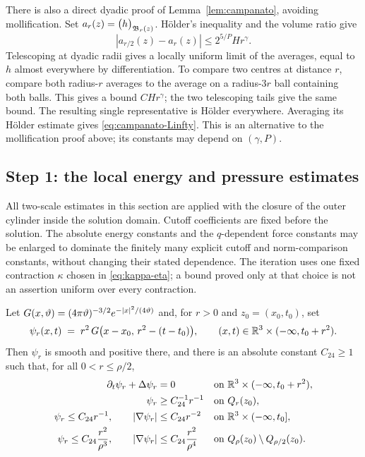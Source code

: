 \documentclass[11pt,reqno]{amsart}
\begin{document}
\begin{remark}
There is also a direct dyadic proof of Lemma~\ref{lem:campanato}, avoiding
mollification. Set $a_r(z)=\bigl(h\bigr)_{\mathfrak B_r(z)}$.
H\"older's inequality and the volume ratio give
\[
 |a_{r/2}(z)-a_r(z)|\le 2^{5/P}H r^\gamma .
\]
Telescoping at dyadic radii gives a locally uniform limit of the averages,
equal to $h$ almost everywhere by differentiation. To compare two centres
at distance $r$, compare both radius-$r$ averages to the average on a
radius-$3r$ ball containing both balls. This gives a bound $CHr^\gamma$;
the two telescoping tails give the same bound. The resulting single
representative is H\"older everywhere. Averaging its H\"older estimate
gives \eqref{eq:campanato-Linfty}. This is an alternative to the
mollification proof above; its constants may depend on $(\gamma,P)$.
\end{remark}

\subsection{Step 1: the local energy and pressure estimates}\label{ss:step1}

All two-scale estimates in this section are applied with the closure of
the outer cylinder inside the solution domain. Cutoff coefficients are
fixed before the solution. The absolute energy constants and the
$q$-dependent force constants may be enlarged to dominate the finitely
many explicit cutoff and norm-comparison constants, without changing
their stated dependence. The iteration uses one fixed contraction
$\kappa$ chosen in \eqref{eq:kappa-eta}; a bound proved only at that
choice is not an assertion uniform over every contraction.

\begin{lemma}\label{lem:gaussian}
Let $G(x,\vartheta)=(4\pi\vartheta)^{-3/2}e^{-\left\lvert x \right\rvert^{2}/(4\vartheta)}$ and, for
$r>0$ and $z_{0}=(x_{0},t_{0})$, set
\begin{equation}\label{eq:psi-r}
  \psi_{r}(x,t)\;=\;r^{2}\,G\bigl(x-x_{0},\,r^{2}-(t-t_{0})\bigr),
  \qquad (x,t)\in\mathbb{R}^{3}\times(-\infty,t_{0}+r^{2}).
\end{equation}
Then $\psi_{r}$ is smooth and positive there, and there is an absolute constant
$C_{24}\ge1$ such that, for all $0<r\le\rho/2$,
\begin{align}
  \partial_{t}\psi_{r}+\Delta\psi_{r}&=0
    &&\text{on }\mathbb{R}^{3}\times(-\infty,t_{0}+r^{2}),
    \label{eq:psi-backward}\\
  \psi_{r}&\ge C_{24}^{-1}r^{-1} &&\text{on }Q_{r}(z_{0}),
    \label{eq:psi-lower}\\
  \psi_{r}\le C_{24}r^{-1},\qquad
  \left\lvert \nabla\psi_{r} \right\rvert&\le C_{24}r^{-2}
    &&\text{on }\mathbb{R}^{3}\times(-\infty,t_{0}],
    \label{eq:psi-upper}\\
  \psi_{r}\le C_{24}\frac{r^{2}}{\rho^{3}},\qquad
  \left\lvert \nabla\psi_{r} \right\rvert&\le C_{24}\frac{r^{2}}{\rho^{4}}
    &&\text{on }Q_{\rho}(z_{0})\setminus Q_{\rho/2}(z_{0}) .
    \label{eq:psi-far}
\end{align}
\end{lemma}
\end{document}

